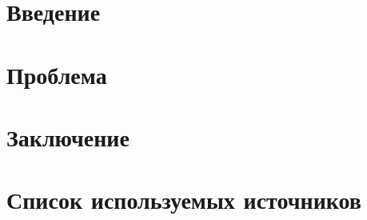 





\tableofcontents
\newpage

\section{Введение}

\Blindtext

\section{Проблема}

\Blindtext

\section{Заключение}

\Blindtext

\section{Список используемых источников}


